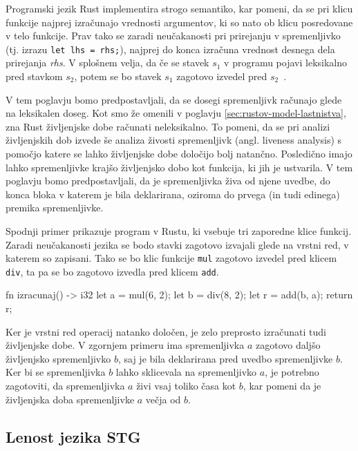 Programski jezik Rust implementira strogo semantiko, kar pomeni, da se pri klicu funkcije najprej izračunajo vrednosti argumentov, ki so nato ob klicu posredovane v telo funkcije. Prav tako se zaradi neučakanosti pri prirejanju v spremenljivko (tj. izrazu \texttt{let lhs = rhs;}), najprej do konca izračuna vrednost desnega dela prirejanja \textit{rhs}. V splošnem velja, da če se stavek $s_1$ v programu pojavi leksikalno pred stavkom $s_2$, potem se bo stavek $s_1$ zagotovo izvedel pred $s_2$~\komentar{\cite{}}.

V tem poglavju bomo predpostavljali, da se dosegi spremenljivk računajo glede na leksikalen doseg. Kot smo že omenili v poglavju \ref{sec:rustov-model-lastnistva}, zna Rust življenjske dobe računati neleksikalno. To pomeni, da se pri analizi živ\-ljenj\-skih dob izvede še analiza živosti spremenljivk (angl. liveness analysis) s pomočjo katere se lahko življenjske dobe določijo bolj natančno. Posledično imajo lahko spremenljivke krajšo življenjsko dobo kot funkcija, ki jih je ustvarila. V tem poglavju bomo predpostavljali, da je spremenljivka živa od njene uvedbe, do konca bloka v katerem je bila deklarirana, oziroma do prvega (in tudi edinega) premika spremenljivke.

Spodnji primer prikazuje program v Rustu, ki vsebuje tri zaporedne klice funkcij. Zaradi neučakanosti jezika se bodo stavki zagotovo izvajali glede na vrstni red, v katerem so zapisani. Tako se bo klic funkcije \texttt{mul} zagotovo izvedel pred klicem \texttt{div}, ta pa se bo zagotovo izvedla pred klicem \texttt{add}.

\begin{rust-success}
fn izracunaj() -> i32 {
    let a = mul(6, 2);
    let b = div(8, 2);
    let r = add(b, a);
    return r;
}
\end{rust-success}



Ker je vrstni red operacij natanko določen, je zelo preprosto izračunati tudi življenjske dobe. V zgornjem primeru ima spremenljivka $a$ zagotovo daljšo življenjsko spremenljivko $b$, saj je bila deklarirana pred uvedbo spremenljivke $b$. Ker bi se spremenljivka $b$ lahko sklicevala na spremenljivko $a$, je potrebno zagotoviti, da spremenljivka $a$ živi vsaj toliko časa kot $b$, kar pomeni da je življenjska doba spremenljivke $a$ večja od $b$.

\subsection{Lenost jezika STG}

